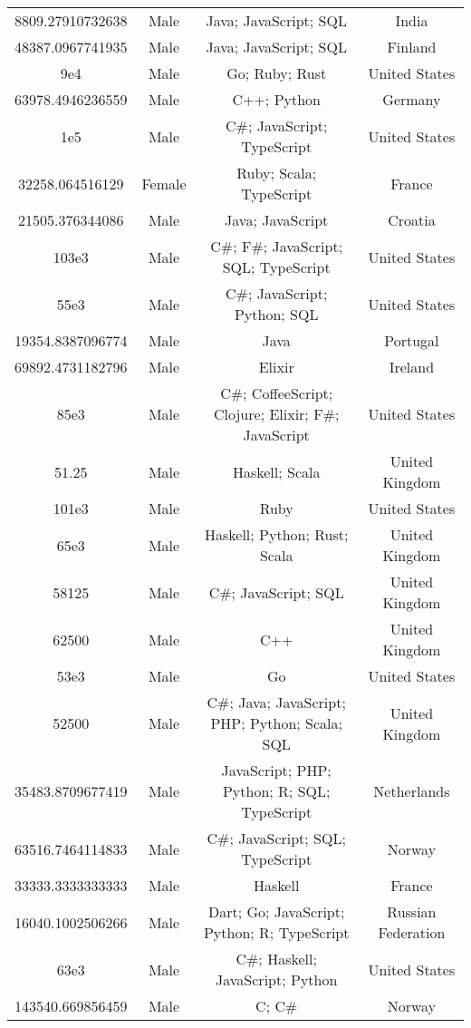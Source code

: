 \begin{center}
\begin{tabular}{ |c|c|c|c| }
8809.27910732638  &  Male  &  Java; JavaScript; SQL  &  India  \\ 
48387.0967741935  &  Male  &  Java; JavaScript; SQL  &  Finland  \\ 
9e4  &  Male  &  Go; Ruby; Rust  &  United States  \\ 
63978.4946236559  &  Male  &  C++; Python  &  Germany  \\ 
1e5  &  Male  &  C\#; JavaScript; TypeScript  &  United States  \\ 
32258.064516129  &  Female  &  Ruby; Scala; TypeScript  &  France  \\ 
21505.376344086  &  Male  &  Java; JavaScript  &  Croatia  \\ 
103e3  &  Male  &  C\#; F\#; JavaScript; SQL; TypeScript  &  United States  \\ 
55e3  &  Male  &  C\#; JavaScript; Python; SQL  &  United States  \\ 
19354.8387096774  &  Male  &  Java  &  Portugal  \\ 
69892.4731182796  &  Male  &  Elixir  &  Ireland  \\ 
85e3  &  Male  &  C\#; CoffeeScript; Clojure; Elixir; F\#; JavaScript  &  United States  \\ 
51.25  &  Male  &  Haskell; Scala  &  United Kingdom  \\ 
101e3  &  Male  &  Ruby  &  United States  \\ 
65e3  &  Male  &  Haskell; Python; Rust; Scala  &  United Kingdom  \\ 
58125  &  Male  &  C\#; JavaScript; SQL  &  United Kingdom  \\ 
62500  &  Male  &  C++  &  United Kingdom  \\ 
53e3  &  Male  &  Go  &  United States  \\ 
52500  &  Male  &  C\#; Java; JavaScript; PHP; Python; Scala; SQL  &  United Kingdom  \\ 
35483.8709677419  &  Male  &  JavaScript; PHP; Python; R; SQL; TypeScript  &  Netherlands  \\ 
63516.7464114833  &  Male  &  C\#; JavaScript; SQL; TypeScript  &  Norway  \\ 
33333.3333333333  &  Male  &  Haskell  &  France  \\ 
16040.1002506266  &  Male  &  Dart; Go; JavaScript; Python; R; TypeScript  &  Russian Federation  \\ 
63e3  &  Male  &  C\#; Haskell; JavaScript; Python  &  United States  \\ 
143540.669856459  &  Male  &  C; C\#  &  Norway  \\ 

\end{tabular}
\end{center}
